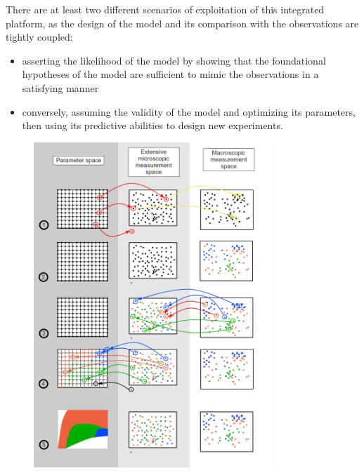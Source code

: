 There are at least two different scenarios of exploitation of this integrated platform, as the design of the model and its comparison with the observations are tightly coupled:
\begin{itemize}
	\item asserting the likelihood of the model by showing that the foundational hypotheses of the model are sufficient to mimic the observations in a satisfying manner
	\item conversely, assuming the validity of the model and optimizing its parameters, then using its predictive abilities to design new experiments.
\end{itemize}
\begin{figure}
\begin{center}
\includegraphics[width=0.8\textwidth]{../../images/experimental_science/phase_diagram2.png}
\end{center}

\end{figure}
